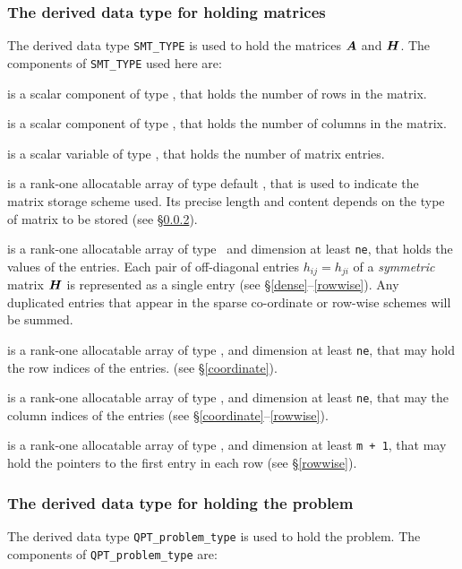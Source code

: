 \documentclass{galahad}
\begin{document}
\subsubsection{The derived data type for holding matrices}\label{typesmt}
The derived data type {\tt SMT\_TYPE} is used to hold the matrices ${\bm{A}}$
and ${\bm{H}}$.
The components of {\tt SMT\_TYPE} used here are:

\begin{description}

 is a scalar component of type \integer,
that holds the number of rows in the matrix.

 is a scalar component of type \integer,
that holds the number of columns in the matrix.

 is a scalar variable of type \integer, that
holds the number of matrix entries.

 is a rank-one allocatable array of type default \character, that
is used to indicate the matrix storage scheme used. Its precise length and
content depends on the type of matrix to be stored (see \S\ref{typeprob}).

 is a rank-one allocatable array of type \realdp\,
and dimension at least {\tt ne}, that holds the values of the entries.
Each pair of off-diagonal entries $h_{ij} = h_{ji}$ of a {\em symmetric}
matrix ${\bm{H}}$ is represented as a single entry
(see \S\ref{dense}--\ref{rowwise}).
Any duplicated entries that appear in the sparse
co-ordinate or row-wise schemes will be summed.

 is a rank-one allocatable array of type \integer,
and dimension at least {\tt ne}, that may hold the row indices of the entries.
(see \S\ref{coordinate}).

 is a rank-one allocatable array of type \integer,
and dimension at least {\tt ne}, that may the column indices of the entries
(see \S\ref{coordinate}--\ref{rowwise}).

 is a rank-one allocatable array of type \integer,
and dimension at least {\tt m + 1}, that may hold the pointers to
the first entry in each row (see \S\ref{rowwise}).

\end{description}


\subsubsection{The derived data type for holding the problem}\label{typeprob}
The derived data type {\tt QPT\_problem\_type} is used to hold
the problem. The components of
{\tt QPT\_problem\_type}
are:
\end{document}
